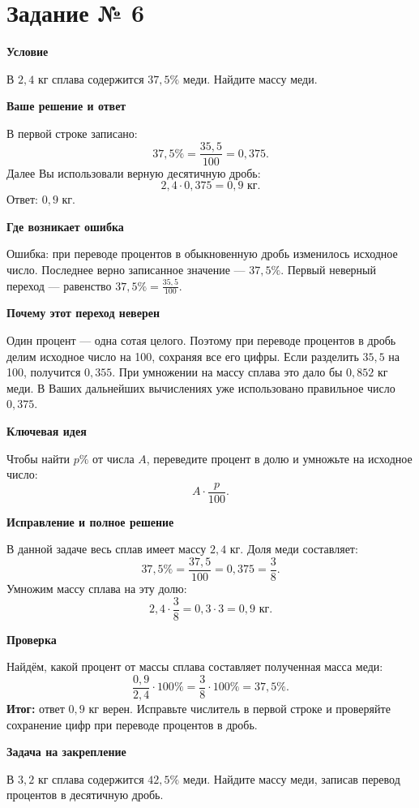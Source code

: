 \documentclass[a4paper,11pt]{article}
\newcommand{\rubric}[1]{\par\smallskip\textbf{\color{darkaccent}#1}\par\nobreak}
\begin{document}
\section*{\color{darkaccent} Задание № 6}
\rubric{Условие}
В $2{,}4$ кг сплава содержится $37{,}5\%$ меди. Найдите массу меди.
\rubric{Ваше решение и ответ}
В первой строке записано:
\[37{,}5\%=\frac{35{,}5}{100}=0{,}375.\]
Далее Вы использовали верную десятичную дробь:
\[2{,}4\cdot0{,}375=0{,}9\text{ кг}.\]
Ответ: $0{,}9$ кг.
\rubric{Где возникает ошибка}
\textcolor{red!75!black}{Ошибка:} при переводе процентов в обыкновенную дробь изменилось исходное число. Последнее верно записанное значение — $37{,}5\%$. Первый неверный переход — равенство $37{,}5\%=\frac{35{,}5}{100}$.
\rubric{Почему этот переход неверен}
Один процент — одна сотая целого. Поэтому при переводе процентов в дробь делим исходное число на 100, сохраняя все его цифры. Если разделить $35{,}5$ на 100, получится $0{,}355$. При умножении на массу сплава это дало бы $0{,}852$ кг меди. В Ваших дальнейших вычислениях уже использовано правильное число $0{,}375$.
\rubric{Ключевая идея}
Чтобы найти $p\%$ от числа $A$, переведите процент в долю и умножьте на исходное число:
\[A\cdot\frac{p}{100}.\]
\rubric{Исправление и полное решение}
В данной задаче весь сплав имеет массу $2{,}4$ кг. Доля меди составляет:
\[37{,}5\%=\frac{37{,}5}{100}=0{,}375=\frac38.\]
Умножим массу сплава на эту долю:
\[2{,}4\cdot\frac38=0{,}3\cdot3=0{,}9\text{ кг}.\]
\rubric{Проверка}
Найдём, какой процент от массы сплава составляет полученная масса меди:
\[\frac{0{,}9}{2{,}4}\cdot100\%=\frac38\cdot100\%=37{,}5\%.\]
\textcolor{accent}{\textbf{Итог:}} ответ $0{,}9$ кг верен. Исправьте числитель в первой строке и проверяйте сохранение цифр при переводе процентов в дробь.
\rubric{Задача на закрепление}
В $3{,}2$ кг сплава содержится $42{,}5\%$ меди. Найдите массу меди, записав перевод процентов в десятичную дробь.
\end{document}
